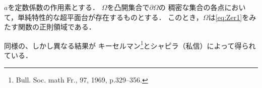\begin{PRP}
    \(a\)を定数係数の作用素とする．
    \(\Omega\)を凸開集合で\(\partial\Omega\)の
    稠密な集合の各点において，単純特性的な超平面台が存在するものとする．
    このとき，\(\Omega\)は\eqref{eq:Zer1}をみたす関数の正則領域である．
\end{PRP}
\begin{RMK}
    同様の、しかし異なる結果が
    キーセルマン\footnote{
        Bull. Soc. math Fr., 97, 1969, p.329--356.
    }とシャピラ（私信）によって得られている．
\end{RMK}




